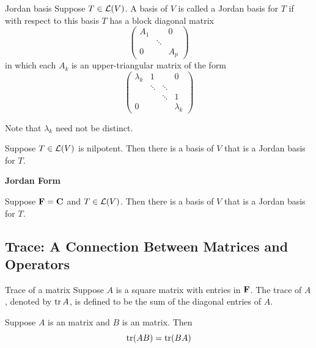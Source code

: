 \documentclass[12pt,a4paper]{article}
\begin{document}
    \begin{defi}{Jordan basis}
        Suppose $T\in\mathcal{L}(V)$. A basis of $V$ is called a Jordan basis for $T$ if with respect to this basis $T$ has a block diagonal matrix
        $$
        \begin{pmatrix}
            A_1 & & 0\\
             &\ddots& \\
             0 & & A_p
        \end{pmatrix}
        $$
        in which each $A_k$ is an upper-triangular matrix of the form
        $$
        \begin{pmatrix}
            \lambda_k & 1 & & 0\\
             &\ddots&\ddots& \\
             & &\ddots& 1 \\
             0 & & & \lambda_k
        \end{pmatrix}
        $$
    \end{defi}
    \begin{remark}
        Note that $\lambda_k$ need not be distinct.
    \end{remark}
    \hfill

    \begin{prop}
        Suppose $T\in\mathcal{L}(V)$ is nilpotent. Then there is a basis of $V$ that is a Jordan basis for $T$.
    \end{prop}
    \begin{thm}
        \textbf{Jordan Form}

        Suppose $\mathbf{F}=\mathbf{C}$ and $T\in\mathcal{L}(V)$. Then there is a basis of $V$ that is a Jordan basis for $T$.
    \end{thm}
    \hfill

    \subsection{Trace: A Connection Between Matrices and Operators}
    \begin{defi}{Trace of a matrix}\addelement{$\tr$}
        Suppose $A$ is a square matrix with entries in $\mathbf{F}$. The trace of $A$, denoted by $\operatorname{tr} A$, is defined to be the sum of the diagonal entries of $A$.
    \end{defi}
    \hfill
    
    \begin{prop}
        Suppose $A$ is an  matrix and $B$ is an  matrix. Then
        $$
        \operatorname{tr}(AB)=\operatorname{tr}(BA)
        $$
    \end{prop} 
    \hfill
\end{document}
